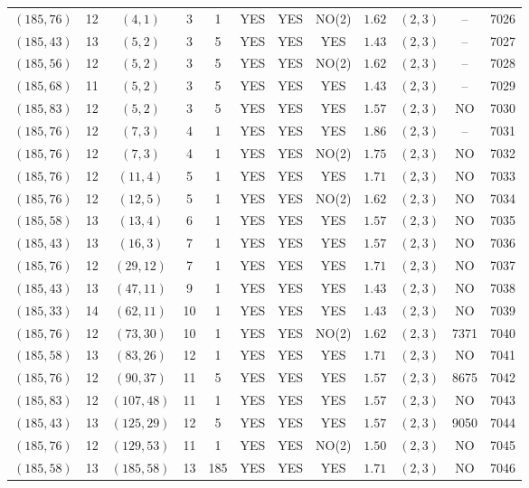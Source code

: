 \begin{longtable}{|c|c|c|c|c|c|c|c|c|c|c|c|}
$(185,76)$ & 12 & $(4,1)$ & 3 & 1 & YES & YES & NO(2) & $1.62$ & $(2,3)$ & -- & 7026\\
$(185,43)$ & 13 & $(5,2)$ & 3 & 5 & YES & YES & YES & $1.43$ & $(2,3)$ & -- & 7027\\
$(185,56)$ & 12 & $(5,2)$ & 3 & 5 & YES & YES & NO(2) & $1.62$ & $(2,3)$ & -- & 7028\\
$(185,68)$ & 11 & $(5,2)$ & 3 & 5 & YES & YES & YES & $1.43$ & $(2,3)$ & -- & 7029\\
$(185,83)$ & 12 & $(5,2)$ & 3 & 5 & YES & YES & YES & $1.57$ & $(2,3)$ & NO & 7030\\
$(185,76)$ & 12 & $(7,3)$ & 4 & 1 & YES & YES & YES & $1.86$ & $(2,3)$ & -- & 7031\\
$(185,76)$ & 12 & $(7,3)$ & 4 & 1 & YES & YES & NO(2) & $1.75$ & $(2,3)$ & NO & 7032\\
$(185,76)$ & 12 & $(11,4)$ & 5 & 1 & YES & YES & YES & $1.71$ & $(2,3)$ & NO & 7033\\
$(185,76)$ & 12 & $(12,5)$ & 5 & 1 & YES & YES & NO(2) & $1.62$ & $(2,3)$ & NO & 7034\\
$(185,58)$ & 13 & $(13,4)$ & 6 & 1 & YES & YES & YES & $1.57$ & $(2,3)$ & NO & 7035\\
$(185,43)$ & 13 & $(16,3)$ & 7 & 1 & YES & YES & YES & $1.57$ & $(2,3)$ & NO & 7036\\
$(185,76)$ & 12 & $(29,12)$ & 7 & 1 & YES & YES & YES & $1.71$ & $(2,3)$ & NO & 7037\\
$(185,43)$ & 13 & $(47,11)$ & 9 & 1 & YES & YES & YES & $1.43$ & $(2,3)$ & NO & 7038\\
$(185,33)$ & 14 & $(62,11)$ & 10 & 1 & YES & YES & YES & $1.43$ & $(2,3)$ & NO & 7039\\
$(185,76)$ & 12 & $(73,30)$ & 10 & 1 & YES & YES & NO(2) & $1.62$ & $(2,3)$ & 7371 & 7040\\
$(185,58)$ & 13 & $(83,26)$ & 12 & 1 & YES & YES & YES & $1.71$ & $(2,3)$ & NO & 7041\\
$(185,76)$ & 12 & $(90,37)$ & 11 & 5 & YES & YES & YES & $1.57$ & $(2,3)$ & 8675 & 7042\\
$(185,83)$ & 12 & $(107,48)$ & 11 & 1 & YES & YES & YES & $1.57$ & $(2,3)$ & NO & 7043\\
$(185,43)$ & 13 & $(125,29)$ & 12 & 5 & YES & YES & YES & $1.57$ & $(2,3)$ & 9050 & 7044\\
$(185,76)$ & 12 & $(129,53)$ & 11 & 1 & YES & YES & NO(2) & $1.50$ & $(2,3)$ & NO & 7045\\
$(185,58)$ & 13 & $(185,58)$ & 13 & 185 & YES & YES & YES & $1.71$ & $(2,3)$ & NO & 7046\\

\end{longtable}
